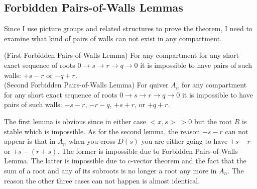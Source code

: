 \subsection{Forbidden Pairs-of-Walls Lemmas}
\indent Since I use picture groups and related structures to prove the theorem, I need to examine what kind of pairs of walls can not exist in any compartment.\\
\begin{lemma}
(First Forbidden Pairs-of-Walls Lemma) For any compartment for any short exact sequence of roots $0\rightarrow s\rightarrow r\rightarrow q\rightarrow 0$ it is impossible to have pairs of such walls: $+s-r$ or $-q+r$.\\
(Second Forbidden Pairs-of-Walls Lemma) For quiver $A_n$ for any compartment for any short exact sequence of roots $0\rightarrow s\rightarrow r\rightarrow q\rightarrow 0$ it is impossible to have pairs of such walls: $-s-r$, $-r-q$, $+s+r$, or $+q+r$.\\
\end{lemma}
\indent The first lemma is obvious since in either case $<x,s>\ >0$ but the root $R$ is stable which is impossible. As for the second lemma, the reason $-s-r$ can not appear is that in $A_n$ when you cross $D(s)$ you are either going to have $+s-r$ or $+s-(r+s)$. The former is impossible due to Forbidden Pairs-of-Walls Lemma. The latter is impossible due to c-vector theorem and the fact that the sum of a root and any of its subroots is no longer a root any more in $A_n$. The reason the other three cases can not happen is almost identical.\\
